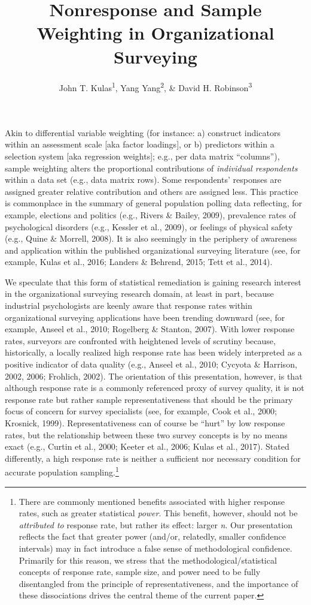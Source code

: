 \documentclass[
  man,mask]{apa7}
\title{Nonresponse and Sample Weighting in Organizational Surveying}
\author{John T. Kulas\textsuperscript{1}, Yang Yang\textsuperscript{2}, \& David H. Robinson\textsuperscript{3}}
\date{}
\affiliation{\vspace{0.5cm}\textsuperscript{1} Montclair State University\\\textsuperscript{2} Roche Group\\\textsuperscript{3} St.~Cloud State University}
\begin{document}
\maketitle

Akin to differential variable weighting (for instance: a) construct indicators within an assessment scale {[}aka factor loadings{]}, or b) predictors within a selection system {[}aka regression weights{]}; e.g., per data matrix ``columns''), sample weighting alters the proportional contributions of \emph{individual respondents} within a data set (e.g., data matrix rows). Some respondents' responses are assigned greater relative contribution and others are assigned less. This practice is commonplace in the summary of general population polling data reflecting, for example, elections and politics (e.g., Rivers \& Bailey, 2009), prevalence rates of psychological disorders (e.g., Kessler et al., 2009), or feelings of physical safety (e.g., Quine \& Morrell, 2008). It is also seemingly in the periphery of awareness and application within the published organizational surveying literature (see, for example, Kulas et al., 2016; Landers \& Behrend, 2015; Tett et al., 2014).

We speculate that this form of statistical remediation is gaining research interest in the organizational surveying research domain, at least in part, because industrial psychologists are keenly aware that response rates within organizational surveying applications have been trending downward (see, for example, Anseel et al., 2010; Rogelberg \& Stanton, 2007). With lower response rates, surveyors are confronted with heightened levels of scrutiny because, historically, a locally realized high response rate has been widely interpreted as a positive indicator of data quality (e.g., Anseel et al., 2010; Cycyota \& Harrison, 2002, 2006; Frohlich, 2002). The orientation of this presentation, however, is that although response rate is a commonly referenced proxy of survey quality, it is not response rate but rather sample representativeness that should be the primary focus of concern for survey specialists (see, for example, Cook et al., 2000; Krosnick, 1999). Representativeness can of course be ``hurt'' by low response rates, but the relationship between these two survey concepts is by no means exact (e.g., Curtin et al., 2000; Keeter et al., 2006; Kulas et al., 2017). Stated differently, a high response rate is neither a sufficient nor necessary condition for accurate population sampling.\footnote{There are commonly mentioned benefits associated with higher response rates, such as greater statistical \emph{power}. This benefit, however, should not be \emph{attributed to} response rate, but rather its effect: larger \emph{n}. Our presentation reflects the fact that greater power (and/or, relatedly, smaller confidence intervals) may in fact introduce a false sense of methodological confidence. Primarily for this reason, we stress that the methodological/statistical concepts of response rate, sample size, and power need to be fully disentangled from the principle of representativeness, and the importance of these dissociations drives the central theme of the current paper.}
\end{document}
